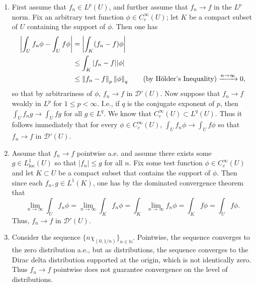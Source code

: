 \documentclass{article}
\begin{document}
	\begin{enumerate}[itemsep =-2pt,label = \alph{*}.]
		\item First assume that $f_{n} \in L^{p}(U)$, and further assume that $f_{n} \to f$ in the $L^{p}$ norm. Fix an arbitrary test function $\phi \in C_{c}^{\infty}(U)$; let $K$ be a compact subset of $U$ containing the support of $\phi$. Then one has 
		\begin{align*}
			\begin{split}
				\left| \int_{U}f_{n}\phi - \int_{U}f\phi \right| &= \left| \int_{K} (f_{n} - f)\phi \right| \\
				&\leq \int_{K} |f_{n} - f||\phi|  \\
				&\leq \left\Vert f _{n}  -f \right\Vert_{p}\left\Vert \phi \right\Vert_{q} \qquad (\text{by H\"older's Inequality}) \xrightarrow{n \to\infty} 0, 
			\end{split}
		\end{align*}
		so that by arbitrariness of $\phi$, $f_{n} \to f$ in $\mathcal{D}'(U)$. Now suppose that $f_{n} \to f$ weakly in $L^{p}$ for $1 \leq p < \infty$. I.e., if $q$ is the conjugate exponent of $p$, then $\int_{U} f_{n}g \to \int_{U}fg$ for all $g \in L^{q}$. We know that $C_{c}^{\infty}(U) \subset L^{q}(U)$. Thus it follows immediately that for every $\phi \in C_{c}^{\infty}(U)$, $\int_{U}f_{n}\phi \to \int_{U}f\phi$ so that $f_{n} \to f$ in $\mathcal{D}'(U)$. 
		\item Assume that $f_{n} \to f$ pointwise a.e. and assume there exists some $g \in L^{1}_{\text{loc}}(U)$ so that $|f_{n}|\leq g$ for all $n$. Fix some test function $\phi \in C_{c}^{\infty}(U)$ and let $K \subset U$ be a compact subset that contains the support of $\phi$. Then since each $f_{n}, g \in L^{1}(K)$, one has by the dominated convergence theorem that 
		\begin{equation*}
			\lim_{n \to \infty} \int_{U}f_{n}\phi = \lim_{n \to \infty}\int_{K}f_{n}\phi = \int_{K}\lim_{n \to \infty}f_{n}\phi = \int_{K}f\phi = \int_{U}f\phi.  
		\end{equation*}
		Thus, $f_{n} \to f$ in $\mathcal{D}'(U)$. 
		\item Consider the sequence $\{n\chi_{(0,1/n)}\}_{n \in \mathbb{N}}$. Pointwise, the sequence converges to the zero distribution a.e., but as distributions, the sequence converges to the Dirac delta distribution supported at the origin, which is not identically zero. Thus $f_{n} \to f$ pointwise does not guarantee convergence on the level of distributions. 
	\end{enumerate}
	
\end{document}
